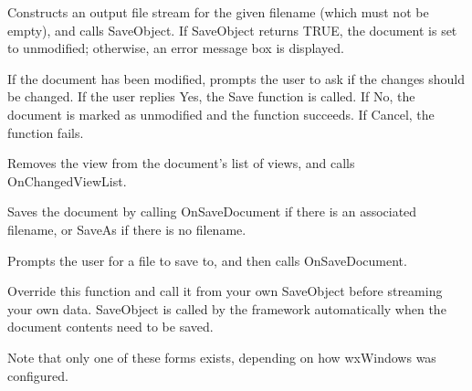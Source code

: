 

Constructs an output file stream for the given filename (which must not be empty),
and calls SaveObject. If SaveObject returns TRUE, the document is set to
unmodified; otherwise, an error message box is displayed.



If the document has been modified, prompts the user to ask if the changes should
be changed. If the user replies Yes, the Save function is called. If No, the
document is marked as unmodified and the function succeeds. If Cancel, the
function fails.



Removes the view from the document's list of views, and calls OnChangedViewList.



Saves the document by calling OnSaveDocument if there is an associated filename,
or SaveAs if there is no filename.



Prompts the user for a file to save to, and then calls OnSaveDocument.




Override this function and call it from your own SaveObject before
streaming your own data. SaveObject is called by the framework
automatically when the document contents need to be saved.

Note that only one of these forms exists, depending on how wxWindows
was configured.



